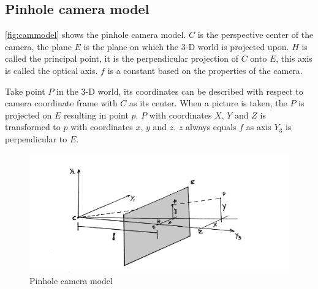 \subsection{Pinhole camera model}
\autoref{fig:cammodel} shows the pinhole camera model. $C$ is the perspective center of the camera, the plane $E$ is the plane on which the 3-D world is projected upon. $H$ is called the principal point, it is the perpendicular projection of $C$ onto $E$, this axis is called the optical axis. $f$ is a constant based on the properties of the camera.\bigskip

Take point $P$ in the 3-D world, its coordinates can be described with respect to camera coordinate frame with $C$ as its center. When a picture is taken, the $P$ is projected on $E$ resulting in point $p$. $P$ with coordinates $X$, $Y$ and $Z$ is transformed to $p$ with coordinates $x$, $y$ and $z$. $z$ always equals $f$ as axis $Y_3$ is perpendicular to $E$.\bigskip

\begin{figure}
    \centering
    \includegraphics[width=1\textwidth]{figures/camera_model.jpg}
    \caption{Pinhole camera model}
    \label{fig:cammodel}
\end{figure}

